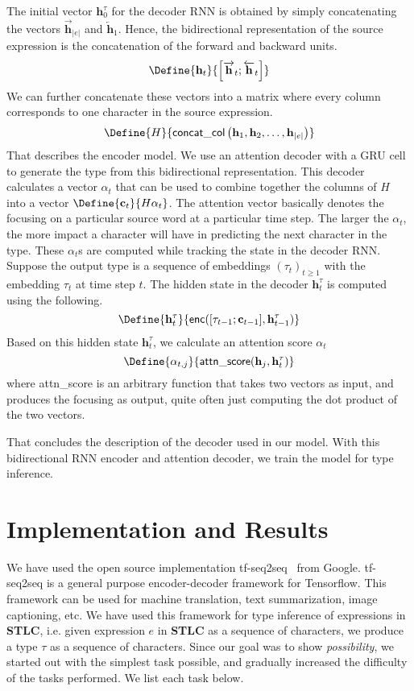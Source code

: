 \documentclass[twocolumn,9pt]{article}
\theoremstyle{definition}
\theoremstyle{remark}
\numberwithin{equation}{section}
\newcommand\Abs[1]{\left\vert{#1}\right\vert}
\newcommand\Squares[1]{\left[#1\right]}
\newcommand\STLC{{\sffamily\bfseries{}STLC}}
\newcommand{\Ht}[1]{\mathbf{h}_{#1}}
\newcommand{\Htf}[1]{\overrightarrow{\mathbf{h}}_{#1}}
\newcommand{\Htb}[1]{\overleftarrow{\mathbf{h}}_{#1}}
\newcommand{\Htd}[1]{\mathbf{h}^{\tau}_{#1}}
\newcommand{\Al}[1]{\alpha_{#1}}
\begin{document}
The initial vector $\Htd{0}$ for the decoder RNN is obtained by simply
concatenating the vectors $\Htf{\Abs{e}}$ and $\Htb{1}$. Hence, the
bidirectional representation of the source expression is the
concatenation of the forward and backward units.
\[
  \Define{
    \Ht{t}
  }{
    \Squares{\Htf{t} ; \Htb{t}}
  }
\]
We can further concatenate these vectors into a matrix where every
column corresponds to one character in the source expression.
\[
  \Define{H}{
    \mathsf{concat\_col}\left(\Ht{1}, \Ht{2}, \ldots, \Ht{\Abs{e}}\right)
  }
\]
That describes the encoder model. We use an attention decoder
with a GRU cell to generate
the type from this bidirectional representation. This decoder calculates
a vector $\Al{t}$ that can be used to combine together the columns of $H$
into a vector $\Define{\mathbf{c}_t}{H \Al{t}}$. The attention vector basically denotes
the focusing on a particular source word at a particular time step. The larger
the $\Al{t}$, the more impact a character will have in predicting the next
character in the type. These $\Al{t}$s are computed while tracking the state
in the decoder RNN. Suppose the output type is a sequence of embeddings
${(\tau_t)}_{t \geq 1}$ with the embedding $\tau_t$ at time step $t$.
The hidden state in the decoder $\Htd{t}$ is computed
using the following.
\[
\Define{\Htd{t}}{\mathsf{enc}([\tau_{t-1} ; \mathbf{c}_{t-1}], \Htd{t-1})}
\]
Based on this hidden state $\Htd{t}$, we calculate an attention score $\Al{t}$
\[
\Define{\Al{t, j}}{\mathsf{attn\_score}(\Ht{j}, \Htd{t})}
\]
where attn\_score is an arbitrary function that takes two vectors as input,
and produces the focusing as output, quite often just computing the dot
product of the two vectors.

That concludes the description of the decoder used in our model. With this
bidirectional RNN encoder and attention decoder, we train the model for
type inference.

\section{Implementation and Results}
We have used the open source implementation tf-seq2seq~\cite{Britz2017}
from Google. tf-seq2seq is a general purpose encoder-decoder framework
for Tensorflow. This framework can be used for machine translation, text
summarization, image captioning, etc. We have used this framework
for type inference of expressions in \STLC{}, i.e. given expression $e$ in
\STLC{} as a sequence of characters, we produce a type $\tau$ as a sequence
of characters. Since our goal was to show \textit{possibility}, we started out
with the simplest task possible, and gradually increased the difficulty of the
tasks performed. We list each task below.
\end{document}
